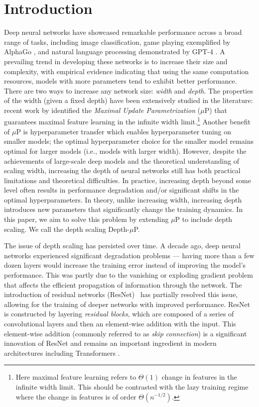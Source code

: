 \section{Introduction}

Deep neural networks have showcased remarkable performance across a broad range of tasks, including image classification, game playing exemplified by AlphaGo \citep{alphago}, and natural language processing demonstrated by GPT-4 \citep{openai2023gpt4}. A prevailing trend in developing these networks is to increase their size and complexity, with empirical evidence indicating that using the same computation resources, models with more parameters tend to exhibit better performance. There are two ways to increase any network size: \emph{width} and \emph{depth}. The properties of the width (given a fixed depth) have been extensively studied in the literature: recent work by \citet{yang2022tensor} identified the \emph{Maximal Update Parametrization} ($\mu$P) that guarantees maximal feature learning in the infinite width limit.\footnote{Here maximal feature learning refers to $\Theta(1)$ change in features in the infinite width limit. This should be contrasted with the lazy training regime where the change in features is of order $\Theta(n^{-1/2})$.} Another benefit of $\mu$P is hyperparameter transfer which enables hyperparameter tuning on smaller models; the optimal hyperparameter choice for the smaller model remains optimal for larger models (i.e., models with larger width). However, despite the achievements of large-scale deep models and the theoretical understanding of scaling width, increasing the depth of neural networks still has both practical limitations and theoretical difficulties. In practice, increasing depth beyond some level often results in performance degradation and/or significant shifts in the optimal hyperparameters. In theory, unlike increasing width, increasing depth introduces new parameters that significantly change the training dynamics. In this paper, we aim to solve this problem by extending $\mu$P to include depth scaling. We call the depth scaling Depth-$\mu$P.

The issue of depth scaling has persisted over time. A decade ago, deep neural networks experienced significant degradation problems --- having more than a few dozen layers would increase the training error instead of improving the model's performance. This was partly due to the vanishing or exploding gradient problem that affects the efficient propagation of information through the network. The introduction of residual networks (ResNet)~\citep{he2016deep,he2016identity, srivastava2015highway} has partially resolved this issue, allowing for the training of deeper networks with improved performance. ResNet is constructed by layering \emph{residual blocks}, which are composed of a series of convolutional layers and then an element-wise addition with the input. This element-wise addition (commonly referred to as \emph{skip connection}) is a significant innovation of ResNet and remains an important ingredient in modern architectures including Transformers \citep{vaswani2017attention}. 

